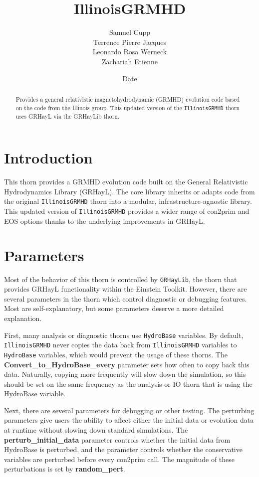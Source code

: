 \documentclass{article}
\newcommand{\igm}{\texttt{IllinoisGRMHD}\xspace}
\newcommand{\hydrobase}{\texttt{HydroBase}\xspace}
\begin{document}
\title{IllinoisGRMHD}
\author{Samuel Cupp \\ Terrence Pierre Jacques \\ Leonardo Rosa Werneck \\ Zachariah Etienne}
\date{$ $Date$ $}

\maketitle


\begin{abstract}
Provides a general relativistic magnetohydrodynamic (GRMHD)
evolution code based on the code from the Illinois group.
This updated version of the \igm thorn uses GRHayL via the
GRHayLib thorn.
\end{abstract}

\section{Introduction}

This thorn provides a GRMHD evolution code built on
the General Relativistic Hydrodynamics Library (GRHayL).
The core library inherits or adapts code from the original
\igm thorn into a modular, infrastructure-agnostic
library. This updated version of \igm provides a wider
range of con2prim and EOS options thanks to the underlying
improvements in GRHayL.

\section{Parameters}

Most of the behavior of this thorn is controlled by
\texttt{GRHayLib}, the thorn that provides GRHayL functionality
within the Einstein Toolkit. However, there are several
parameters in the thorn which control diagnostic or debugging
features. Most are self-explanatory, but some parameters deserve
a more detailed explanation.

First, many analysis or diagnostic thorns use \hydrobase variables.
By default, \igm never copies the data back from \igm variables
to \hydrobase variables, which would prevent the usage of these
thorns. The \textbf{Convert\_to\_HydroBase\_every} parameter
sets how often to copy back this data. Naturally, copying more
frequently will slow down the simulation, so this should be set
on the same frequency as the analysis or IO thorn that is using
the HydroBase variable.

Next, there are several parameters for debugging or other testing.
The perturbing parameters give users the ability to affect either
the initial data or evolution data at runtime without slowing down
standard simulations. The \textbf{perturb\_initial\_data} parameter
controls whether the initial data from HydroBase is perturbed, and
the  parameter controls whether
the conservative variables are perturbed before every con2prim call.
The magnitude of these perturbations is set by \textbf{random\_pert}.

\end{document}
